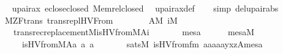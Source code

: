 \begin{isabellebody}
%
\isadelimproof
\ \ %
\endisadelimproof
%
\isatagproof
{}\isamarkupfalse%
\ upair{\isacharunderscore}{\kern0pt}ax\ eclose{\isacharunderscore}{\kern0pt}closed\ Memrel{\isacharunderscore}{\kern0pt}closed\ \isamarkupfalse%
\ upair{\isacharunderscore}{\kern0pt}ax{\isacharunderscore}{\kern0pt}def\isanewline
\ \ \isamarkupfalse%
\ {\isacharparenleft}{\kern0pt}simp\ del{\isacharcolon}{\kern0pt}upair{\isacharunderscore}{\kern0pt}abs{\isacharparenright}{\kern0pt}%
\endisatagproof
{\isafoldproof}%
%
\isadelimproof
\isanewline
%
\endisadelimproof
\isanewline
\isanewline
{}\isamarkupfalse%
\ {\isacharparenleft}{\kern0pt}\ M{\isacharunderscore}{\kern0pt}ZF{\isacharunderscore}{\kern0pt}trans{\isacharparenright}{\kern0pt}\ trans{\isacharunderscore}{\kern0pt}repl{\isacharunderscore}{\kern0pt}HVFrom\ {\isacharcolon}{\kern0pt}\isanewline
\ \ \isanewline
\ \ \ \ {\isachardoublequoteopen}A{\isasymin}M{\isachardoublequoteclose}\ {\isachardoublequoteopen}i{\isasymin}M{\isachardoublequoteclose}\isanewline
\ \ \isanewline
\ \ \ \ {\isachardoublequoteopen}transrec{\isacharunderscore}{\kern0pt}replacement{\isacharparenleft}{\kern0pt}{\isacharhash}{\kern0pt}{\isacharhash}{\kern0pt}M{\isacharcomma}{\kern0pt}is{\isacharunderscore}{\kern0pt}HVfrom{\isacharparenleft}{\kern0pt}{\isacharhash}{\kern0pt}{\isacharhash}{\kern0pt}M{\isacharcomma}{\kern0pt}A{\isacharparenright}{\kern0pt}{\isacharcomma}{\kern0pt}i{\isacharparenright}{\kern0pt}{\isachardoublequoteclose}\isanewline
%
\isadelimproof
%
\endisadelimproof
%
\isatagproof
{}\isamarkupfalse%
\ {\isacharminus}{\kern0pt}\isanewline
\ \ \isacommand{{\isacharbraceleft}{\kern0pt}}\isamarkupfalse%
\ \isamarkupfalse%
\ mesa\isanewline
\ \ \ \ \isamarkupfalse%
\ {\isachardoublequoteopen}mesa{\isasymin}M{\isachardoublequoteclose}\isanewline
\ \ \ \ \isamarkupfalse%
\isanewline
\ \ \ \ \ \ {}{\isacharcolon}{\kern0pt}{\isachardoublequoteopen}is{\isacharunderscore}{\kern0pt}HVfrom{\isacharparenleft}{\kern0pt}{\isacharhash}{\kern0pt}{\isacharhash}{\kern0pt}M{\isacharcomma}{\kern0pt}A{\isacharcomma}{\kern0pt}a{}{\isacharcomma}{\kern0pt}\ a{}{\isacharcomma}{\kern0pt}\ a{}{\isacharparenright}{\kern0pt}\ {\isasymlongleftrightarrow}\isanewline
\ \ \ \ \ \ sats{\isacharparenleft}{\kern0pt}M{\isacharcomma}{\kern0pt}\ is{\isacharunderscore}{\kern0pt}HVfrom{\isacharunderscore}{\kern0pt}fm{\isacharparenleft}{\kern0pt}{}{\isacharcomma}{\kern0pt}{}{\isacharcomma}{\kern0pt}{}{\isacharcomma}{\kern0pt}{}{\isacharparenright}{\kern0pt}{\isacharcomma}{\kern0pt}\ {\isacharbrackleft}{\kern0pt}a{}{\isacharcomma}{\kern0pt}a{}{\isacharcomma}{\kern0pt}a{}{\isacharcomma}{\kern0pt}a{}{\isacharcomma}{\kern0pt}a{}{\isacharcomma}{\kern0pt}y{\isacharcomma}{\kern0pt}x{\isacharcomma}{\kern0pt}z{\isacharcomma}{\kern0pt}A{\isacharcomma}{\kern0pt}mesa{\isacharbrackright}{\kern0pt}{\isacharparenright}{\kern0pt}{\isachardoublequoteclose}\isanewline

\end{isabellebody}
